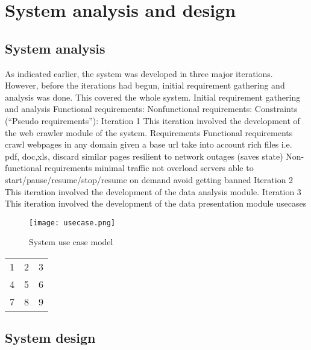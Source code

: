 \chapter{System analysis and design}
\section{System analysis}
As indicated earlier, the system was developed in three major iterations. However, before the
iterations had begun, initial requirement gathering and analysis was done. This covered the whole
system.
Initial requirement gathering and analysis
Functional requirements:
Nonfunctional requirements:
Constraints (“Pseudo requirements”):
Iteration 1
This iteration involved the development of the web crawler module of the system.
Requirements
Functional requirements
crawl webpages in any domain given a base url
take into account rich files i.e. pdf, doc,xls,
discard similar pages
resilient to network outages (saves state)
Non-functional requirements
minimal traffic
not overload servers
able to start/pause/resume/stop/resume on demand
avoid getting banned
Iteration 2
This iteration involved the development of the data analysis module.
Iteration 3
This iteration involved the development of the data presentation module
usecases
\begin{figure}
	\texttt{[image: usecase.png]}
	\caption{System use case model}
\end{figure}

\begin{tabular}{ l | c || r }
  1 & 2 & 3 \\
  4 & 5 & 6 \\
  7 & 8 & 9 \\
\end{tabular}

\section{System design}

